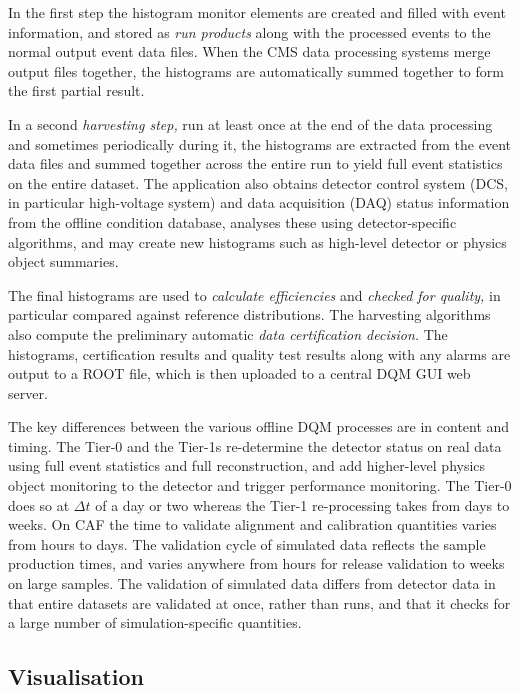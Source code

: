 \documentclass[a4paper]{jpconf}
\begin{document}
In the first step the histogram monitor elements are created and filled with
event information, and stored as {\em run products} along with the processed
events to the normal output event data files.  When the CMS data processing
systems merge output files together, the histograms are automatically summed
together to form the first partial result.

In a second {\em harvesting step,} run at least once at the end of the data
processing and sometimes periodically during it, the histograms are extracted
from the event data files and summed together across the entire run to yield
full event statistics on the entire dataset.  The application also obtains
detector control system (DCS, in particular high-voltage system) and data
acquisition (DAQ) status information from the offline condition database,
analyses these using detector-specific algorithms, and may create new
histograms such as high-level detector or physics object summaries.

The final histograms are used to {\em calculate efficiencies} and {\em checked
  for quality,} in particular compared against reference distributions.  The
harvesting algorithms also compute the preliminary automatic {\em data
  certification decision.}  The histograms, certification results and quality
test results along with any alarms are output to a ROOT file, which is then
uploaded to a central DQM GUI web server.

The key differences between the various offline DQM processes are in content
and timing.  The Tier-0 and the Tier-1s re-determine the detector status on
real data using full event statistics and full reconstruction, and add
higher-level physics object monitoring to the detector and trigger performance
monitoring.  The Tier-0 does so at $\Delta t$ of a day or two whereas the
Tier-1 re-processing takes from days to weeks.  On CAF the time to validate
alignment and calibration quantities varies from hours to days.  The
validation cycle of simulated data reflects the sample production times, and
varies anywhere from hours for release validation to weeks on large samples.
The validation of simulated data differs from detector data in that entire
datasets are validated at once, rather than runs, and that it checks for a
large number of simulation-specific quantities.

\subsection{Visualisation}
\end{document}
